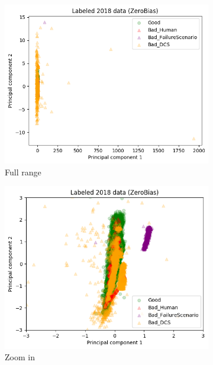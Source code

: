 \begin{figure}[h!]
\centering
    \begin{subfigure}[b]{0.49\linewidth}
        \includegraphics[width=\linewidth]{images/reco/2018/ZeroBias_label_separate.png}
        \caption{Full range}
    \end{subfigure}
    \begin{subfigure}[b]{0.49\linewidth}
        \includegraphics[width=\linewidth]{images/reco/2018/ZeroBias_label_separate_short_range.png}
        \caption{Zoom in}
    \end{subfigure}
    \begin{subfigure}[b]{0.49\linewidth}

\end{subfigure}
\end{figure}
